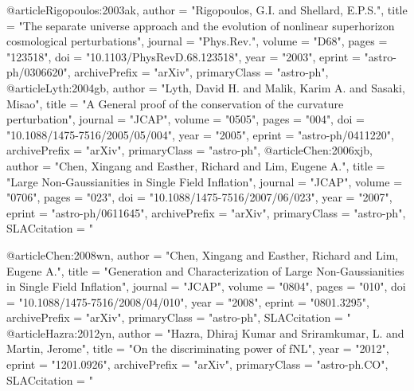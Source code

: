 @article{Rigopoulos:2003ak,
      author         = "Rigopoulos, G.I. and Shellard, E.P.S.",
      title          = "{The separate universe approach and the evolution of
                        nonlinear superhorizon cosmological perturbations}",
      journal        = "Phys.Rev.",
      volume         = "D68",
      pages          = "123518",
      doi            = "10.1103/PhysRevD.68.123518",
      year           = "2003",
      eprint         = "astro-ph/0306620",
      archivePrefix  = "arXiv",
      primaryClass   = "astro-ph",
}
@article{Lyth:2004gb,
      author         = "Lyth, David H. and Malik, Karim A. and Sasaki, Misao",
      title          = "{A General proof of the conservation of the curvature
                        perturbation}",
      journal        = "JCAP",
      volume         = "0505",
      pages          = "004",
      doi            = "10.1088/1475-7516/2005/05/004",
      year           = "2005",
      eprint         = "astro-ph/0411220",
      archivePrefix  = "arXiv",
      primaryClass   = "astro-ph",
}
@article{Chen:2006xjb,
      author         = "Chen, Xingang and Easther, Richard and Lim, Eugene A.",
      title          = "{Large Non-Gaussianities in Single Field Inflation}",
      journal        = "JCAP",
      volume         = "0706",
      pages          = "023",
      doi            = "10.1088/1475-7516/2007/06/023",
      year           = "2007",
      eprint         = "astro-ph/0611645",
      archivePrefix  = "arXiv",
      primaryClass   = "astro-ph",
      SLACcitation   = "%
}

@article{Chen:2008wn,
      author         = "Chen, Xingang and Easther, Richard and Lim, Eugene A.",
      title          = "{Generation and Characterization of Large
                        Non-Gaussianities in Single Field Inflation}",
      journal        = "JCAP",
      volume         = "0804",
      pages          = "010",
      doi            = "10.1088/1475-7516/2008/04/010",
      year           = "2008",
      eprint         = "0801.3295",
      archivePrefix  = "arXiv",
      primaryClass   = "astro-ph",
      SLACcitation   = "%
}
@article{Hazra:2012yn,
      author         = "Hazra, Dhiraj Kumar and Sriramkumar, L. and Martin,
                        Jerome",
      title          = "{On the discriminating power of fNL}",
      year           = "2012",
      eprint         = "1201.0926",
      archivePrefix  = "arXiv",
      primaryClass   = "astro-ph.CO",
      SLACcitation   = "%
}

